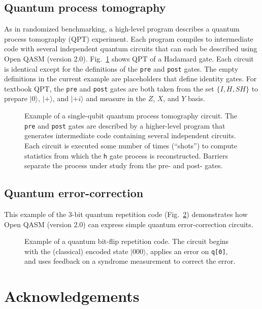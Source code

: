 \documentclass[USenglish,12pt,fleqn]{article} %
\newcommand*{\code}{\texttt}
\begin{document}
\subsection{Quantum process tomography}

As in randomized benchmarking, a high-level program describes a quantum process tomography (QPT) experiment. Each program compiles to intermediate code with several independent quantum circuits that can each be described using Open QASM (version 2.0). Fig.~\ref{fig:example:qpt} shows QPT of a Hadamard gate. Each circuit is identical except for the definitions of the \code{pre} and \code{post} gates. The empty definitions in the current example are placeholders that define identity gates. For textbook QPT, the \code{pre} and \code{post} gates are both taken from the set $\{I,H,SH\}$ to prepare $|0\rangle$, $|+\rangle$, and $|+i\rangle$ and measure in the $Z$, $X$, and $Y$ basis.

\begin{figure}
\centering

\caption{Example of a single-qubit quantum process tomography circuit. The \code{pre} and \code{post} gates are described by a higher-level program that generates intermediate code containing several independent circuits. Each circuit is executed some number of times (``shots'') to compute statistics from which the \code{h} gate process is reconstructed. Barriers separate the process under study from the pre- and post- gates. \label{fig:example:qpt}}
\end{figure}

\subsection{Quantum error-correction}

This example of the 3-bit quantum repetition code (Fig.~\ref{fig:example:qec3}) demonstrates how Open QASM (version 2.0) can express simple quantum error-correction circuits.

\begin{figure}
\centering

\caption{Example of a quantum bit-flip repetition code. The circuit begins with the (classical) encoded state $|000\rangle$, applies an error on \code{q[0]}, and uses feedback on a syndrome measurement to correct the error.
\label{fig:example:qec3}}
\end{figure}

\section{Acknowledgements}
\end{document}
